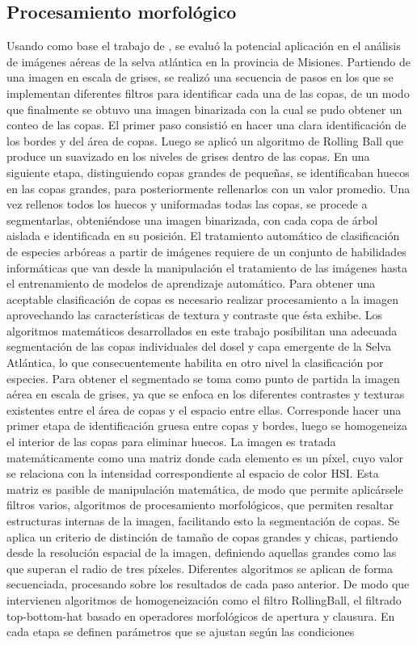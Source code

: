 \subsection{Procesamiento morfológico} %
Usando como base el trabajo de \cite{ferreira_tree_2019}, se evaluó la potencial aplicación en el análisis de imágenes aéreas de la selva atlántica en la provincia de Misiones.
Partiendo de una imagen en escala de grises, se realizó una secuencia de pasos en los que se implementan diferentes filtros para identificar cada una de las copas, de un modo que finalmente se obtuvo una imagen binarizada con la cual se pudo obtener un conteo de las copas. El primer paso consistió en hacer una clara identificación de los bordes y del área de copas. Luego se aplicó un algoritmo de Rolling Ball \cite{sternberg_biomedical_1983} que produce un suavizado en los niveles de grises dentro de las copas. En una siguiente etapa, distinguiendo copas grandes de pequeñas, se identificaban huecos en las copas grandes, para posteriormente rellenarlos con un valor promedio. Una vez rellenos todos los huecos y uniformadas todas las copas, se procede a segmentarlas, obteniéndose una imagen binarizada, con cada copa de árbol aislada e identificada en su posición.
El tratamiento automático de clasificación de especies arbóreas a partir de imágenes requiere de un conjunto de habilidades informáticas que van desde la manipulación el tratamiento de
las imágenes hasta el entrenamiento de modelos de aprendizaje automático. Para obtener una aceptable clasificación de copas es necesario realizar procesamiento a la imagen aprovechando las características de textura y contraste que ésta exhibe. Los algoritmos matemáticos desarrollados en este trabajo posibilitan una adecuada segmentación de las copas individuales del dosel y capa emergente de la Selva Atlántica, lo que consecuentemente habilita en otro nivel la clasificación por especies. Para obtener el segmentado se toma como punto de partida la imagen aérea en escala de grises, ya que se enfoca en los diferentes contrastes y texturas existentes entre el área de copas y el espacio entre ellas. Corresponde hacer una primer etapa de identificación gruesa entre copas y bordes, luego se homogeneiza el interior de las copas para eliminar huecos. La imagen es tratada matemáticamente como una matriz donde cada elemento es un píxel, cuyo valor se relaciona con la intensidad correspondiente al espacio de color HSI. Esta matriz es pasible de manipulación matemática, de modo que permite aplicársele filtros varios, algoritmos de procesamiento morfológicos, que permiten resaltar estructuras internas de la imagen, facilitando esto la segmentación de copas. Se aplica un criterio de distinción de tamaño de copas grandes y chicas, partiendo desde la resolución espacial de la imagen, definiendo aquellas grandes como las que superan el radio de tres píxeles. Diferentes algoritmos se aplican de forma secuenciada, procesando sobre los resultados de cada paso anterior. De modo que intervienen algoritmos de homogeneización como el filtro RollingBall, el filtrado top-bottom-hat basado en operadores morfológicos de apertura y clausura. En cada etapa se definen parámetros que se ajustan según las condiciones
